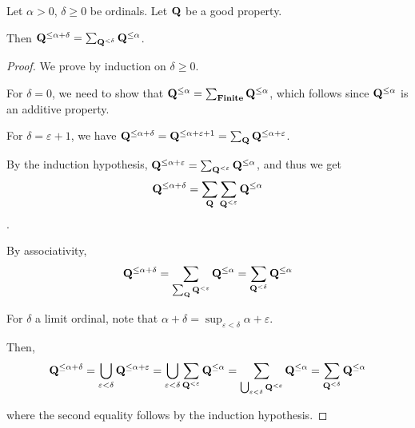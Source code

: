 \begin{lemma}
  Let $\alpha > 0$, $\delta \ge 0$ be ordinals. Let $\mathbf{Q}$ be a good property.

  Then $\mathbf{Q}^{\le \alpha + \delta} = \sum_{\mathbf{Q}^{< \delta}}{\mathbf{Q}^{\le \alpha}}$.
\end{lemma}

\begin{proof}
  We prove by induction on $\delta \ge 0$.

  For $\delta = 0$, we need to show that $\mathbf{Q}^{\le \alpha} = \sum_{\mathbf{Finite}}\mathbf{Q}^{\le \alpha}$,
  which follows since $\mathbf{Q}^{\le \alpha}$ is an additive property.

  For $\delta = \varepsilon + 1$, we have
  $
    \mathbf{Q}^{\le \alpha + \delta}
    = \mathbf{Q}^{\le \alpha + \varepsilon + 1}
    = \sum_{\mathbf{Q}}{\mathbf{Q}^{\le \alpha + \varepsilon}}
  $.
  
  By the induction hypothesis,
  $
    \mathbf{Q}^{\le \alpha + \varepsilon}
    = \sum_{\mathbf{Q}^{< \varepsilon}}{\mathbf{Q}^{\le \alpha}}
  $, and thus we get
  \[
    \mathbf{Q}^{\le \alpha + \delta} = \sum_{\mathbf{Q}}{\sum_{\mathbf{Q}^{< \varepsilon}}{\mathbf{Q}^{\le \alpha}}}
  \].

  By associativity, 
  \[\mathbf{Q}^{\le \alpha + \delta}
  = \sum_{\sum_{\mathbf{Q}}{\mathbf{Q}^{< \varepsilon}}}{\mathbf{Q}^{\le \alpha}}
  =\sum_{\mathbf{Q}^{< \delta}}{\mathbf{Q}^{\le \alpha}}\]

  For $\delta$ a limit ordinal, note that $\alpha + \delta = \sup_{\varepsilon < \delta}{\alpha + \varepsilon}$.

  Then,
  \[
    \mathbf{Q}^{\le \alpha + \delta}
    = \bigcup_{\varepsilon < \delta}{\mathbf{Q}^{\le \alpha + \varepsilon}}
    = \bigcup_{\varepsilon < \delta}{\sum_{\mathbf{Q}^{< \varepsilon}}{\mathbf{Q}^{\le \alpha}}}
    = \sum_{\bigcup_{\varepsilon < \delta}{\mathbf{Q}^{< \varepsilon}}}{\mathbf{Q}^{\le \alpha}}
    = \sum_{\mathbf{Q}^{< \delta}}{\mathbf{Q}^{\le \alpha}}
  \]

  where the second equality follows by the induction hypothesis.

\end{proof}
